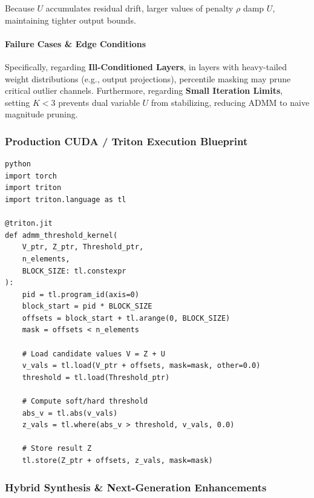 Because $U$ accumulates residual drift, larger values of penalty $\rho$ damp $U$, maintaining tighter output bounds.

\paragraph{Failure Cases \& Edge Conditions}

Specifically, regarding \textbf{Ill-Conditioned Layers}, in layers with heavy-tailed weight distributions (e.g., output projections), percentile masking may prune critical outlier channels. Furthermore, regarding \textbf{Small Iteration Limits}, setting $K < 3$ prevents dual variable $U$ from stabilizing, reducing ADMM to naive magnitude pruning.



\subsubsection*{Production CUDA / Triton Execution Blueprint}

\vspace{0.5em}
\begin{mdframed}[backgroundcolor=codebg, linecolor=codeframe, linewidth=1pt, roundcorner=4pt, innerleftmargin=2pt, innerrightmargin=5pt, innertopmargin=5pt, innerbottommargin=5pt]
\begin{lstlisting}
python
import torch
import triton
import triton.language as tl

@triton.jit
def admm_threshold_kernel(
    V_ptr, Z_ptr, Threshold_ptr,
    n_elements,
    BLOCK_SIZE: tl.constexpr
):
    pid = tl.program_id(axis=0)
    block_start = pid * BLOCK_SIZE
    offsets = block_start + tl.arange(0, BLOCK_SIZE)
    mask = offsets < n_elements

    # Load candidate values V = Z + U
    v_vals = tl.load(V_ptr + offsets, mask=mask, other=0.0)
    threshold = tl.load(Threshold_ptr)

    # Compute soft/hard threshold
    abs_v = tl.abs(v_vals)
    z_vals = tl.where(abs_v > threshold, v_vals, 0.0)

    # Store result Z
    tl.store(Z_ptr + offsets, z_vals, mask=mask)
\end{lstlisting}
\end{mdframed}
\vspace{0.5em}


\subsubsection*{Hybrid Synthesis \& Next-Generation Enhancements}


